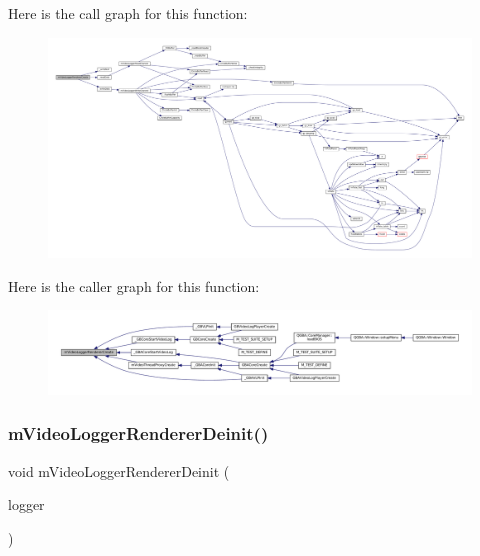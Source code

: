 Here is the call graph for this function\+:
\nopagebreak
\begin{figure}[H]
\begin{center}
\leavevmode
\includegraphics[width=350pt]{video-logger_8c_ad61ee4a99ebbf8066988b0da02c69838_cgraph}
\end{center}
\end{figure}
Here is the caller graph for this function\+:
\nopagebreak
\begin{figure}[H]
\begin{center}
\leavevmode
\includegraphics[width=350pt]{video-logger_8c_ad61ee4a99ebbf8066988b0da02c69838_icgraph}
\end{center}
\end{figure}
\mbox{\label{video-logger_8c_ae525d818fd82d5753562673f85ff0b4d}} 
\subsubsection{\texorpdfstring{m\+Video\+Logger\+Renderer\+Deinit()}{mVideoLoggerRendererDeinit()}}
{\footnotesize\ttfamily void m\+Video\+Logger\+Renderer\+Deinit (\begin{DoxyParamCaption}\item[{struct m\+Video\+Logger $\ast$}]{logger }\end{DoxyParamCaption})}

